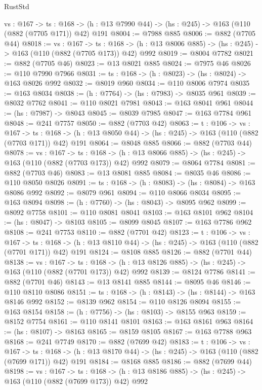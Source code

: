 \begin{lexlean}{RustStd}
\begin{coremodule}
  {vs : @167} ->
  {ts : @168} -> (h : @13 @7990 @44) -> (hs : @245) -> @163 (@110 (@882 (@7705 @171)) @42) @191
@8004 := @7988 @885
@8006 := @882 (@7705 @44)
@8018 := {vs : @167} ->
  {ts : @168} -> (h : @13 @8006 @885) -> (hs : @245) -> @163 (@110 (@882 (@7705 @173)) @42) @992
@8019 := @8004 @7782
@8021 := @882 (@7705 @46)
@8023 := @13 @8021 @885
@8024 := @7975 @46
@8026 := @110 @7990 @7966
@8031 := {ts : @168} -> (h : @8023) -> (hs : @8024) -> @163 @8026 @992
@8032 := @8019 @960
@8034 := @110 @8006 @7974
@8035 := @163 @8034
@8038 := (h : @7764) -> (hs : @7983) -> @8035 @961
@8039 := @8032 @7762
@8041 := @110 @8021 @7981
@8043 := @163 @8041 @961
@8044 := (hs : @7987) -> @8043
@8045 := @8039 @7985
@8047 := @163 @7784 @961
@8048 := @241 @7757
@8050 := @882 (@7703 @42)
@8063 := {t : @106} ->
  {vs : @167} ->
  {ts : @168} -> (h : @13 @8050 @44) -> (hs : @245) -> @163 (@110 (@882 (@7703 @171)) @42) @191
@8064 := @8048 @885
@8066 := @882 (@7703 @44)
@8078 := {vs : @167} ->
  {ts : @168} -> (h : @13 @8066 @885) -> (hs : @245) -> @163 (@110 (@882 (@7703 @173)) @42) @992
@8079 := @8064 @7784
@8081 := @882 (@7703 @46)
@8083 := @13 @8081 @885
@8084 := @8035 @46
@8086 := @110 @8050 @8026
@8091 := {ts : @168} -> (h : @8083) -> (hs : @8084) -> @163 @8086 @992
@8092 := @8079 @961
@8094 := @110 @8066 @8034
@8095 := @163 @8094
@8098 := (h : @7760) -> (hs : @8043) -> @8095 @962
@8099 := @8092 @7758
@8101 := @110 @8081 @8041
@8103 := @163 @8101 @962
@8104 := (hs : @8047) -> @8103
@8105 := @8099 @8045
@8107 := @163 @7786 @962
@8108 := @241 @7753
@8110 := @882 (@7701 @42)
@8123 := {t : @106} ->
  {vs : @167} ->
  {ts : @168} -> (h : @13 @8110 @44) -> (hs : @245) -> @163 (@110 (@882 (@7701 @171)) @42) @191
@8124 := @8108 @885
@8126 := @882 (@7701 @44)
@8138 := {vs : @167} ->
  {ts : @168} -> (h : @13 @8126 @885) -> (hs : @245) -> @163 (@110 (@882 (@7701 @173)) @42) @992
@8139 := @8124 @7786
@8141 := @882 (@7701 @46)
@8143 := @13 @8141 @885
@8144 := @8095 @46
@8146 := @110 @8110 @8086
@8151 := {ts : @168} -> (h : @8143) -> (hs : @8144) -> @163 @8146 @992
@8152 := @8139 @962
@8154 := @110 @8126 @8094
@8155 := @163 @8154
@8158 := (h : @7756) -> (hs : @8103) -> @8155 @963
@8159 := @8152 @7754
@8161 := @110 @8141 @8101
@8163 := @163 @8161 @963
@8164 := (hs : @8107) -> @8163
@8165 := @8159 @8105
@8167 := @163 @7788 @963
@8168 := @241 @7749
@8170 := @882 (@7699 @42)
@8183 := {t : @106} ->
  {vs : @167} ->
  {ts : @168} -> (h : @13 @8170 @44) -> (hs : @245) -> @163 (@110 (@882 (@7699 @171)) @42) @191
@8184 := @8168 @885
@8186 := @882 (@7699 @44)
@8198 := {vs : @167} ->
  {ts : @168} -> (h : @13 @8186 @885) -> (hs : @245) -> @163 (@110 (@882 (@7699 @173)) @42) @992

\end{coremodule}
\end{lexlean}
